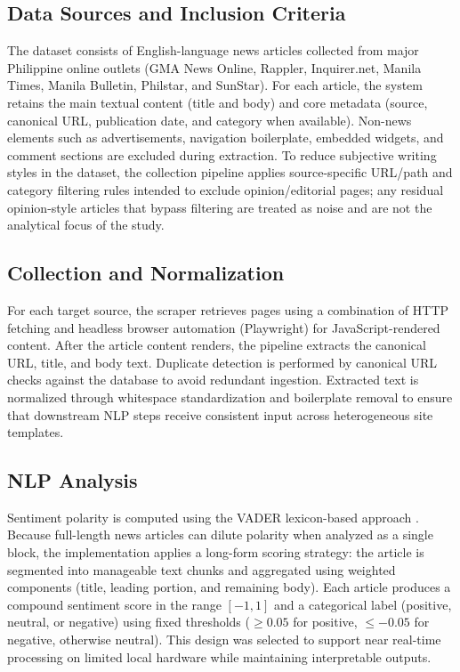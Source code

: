 \documentclass[sigconf, nonacm]{acmart}
\begin{document}
\subsection{Data Sources and Inclusion Criteria}
The dataset consists of English-language news articles collected from major Philippine online outlets (GMA News Online, Rappler, Inquirer.net, Manila Times, Manila Bulletin, Philstar, and SunStar). For each article, the system retains the main textual content (title and body) and core metadata (source, canonical URL, publication date, and category when available). Non-news elements such as advertisements, navigation boilerplate, embedded widgets, and comment sections are excluded during extraction. To reduce subjective writing styles in the dataset, the collection pipeline applies source-specific URL/path and category filtering rules intended to exclude opinion/editorial pages; any residual opinion-style articles that bypass filtering are treated as noise and are not the analytical focus of the study.

\subsection{Collection and Normalization}
For each target source, the scraper retrieves pages using a combination of HTTP fetching and headless browser automation (Playwright) for JavaScript-rendered content. After the article content renders, the pipeline extracts the canonical URL, title, and body text. Duplicate detection is performed by canonical URL checks against the database to avoid redundant ingestion. Extracted text is normalized through whitespace standardization and boilerplate removal to ensure that downstream NLP steps receive consistent input across heterogeneous site templates.

\subsection{NLP Analysis}
Sentiment polarity is computed using the VADER lexicon-based approach \cite{hutto2014vader}. Because full-length news articles can dilute polarity when analyzed as a single block, the implementation applies a long-form scoring strategy: the article is segmented into manageable text chunks and aggregated using weighted components (title, leading portion, and remaining body). Each article produces a compound sentiment score in the range $[-1,1]$ and a categorical label (positive, neutral, or negative) using fixed thresholds ($\geq 0.05$ for positive, $\leq -0.05$ for negative, otherwise neutral). This design was selected to support near real-time processing on limited local hardware while maintaining interpretable outputs.
\end{document}
